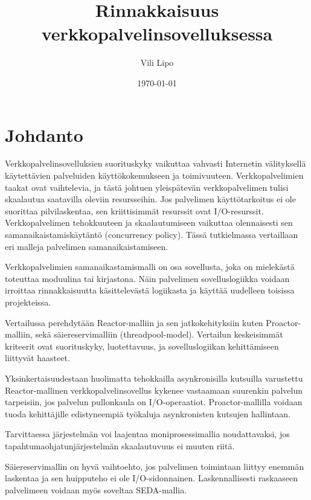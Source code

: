 \documentclass[finnish]{tktltiki2}
\title{Rinnakkaisuus verkkopalvelinsovelluksessa}
\author{Vili Lipo}
\date{\today}
\theoremstyle{definition}
\theoremstyle{remark}
\begin{document}
\frontmatter      %

\maketitle        %
\makeabstract     %

\tableofcontents  %


\mainmatter       %

\section{Johdanto}
Verkkopalvelinsovelluksien suorituskyky vaikuttaa vahvasti
Internetin välityksellä käytettävien palveluiden käyttökokemukseen ja toimivuuteen.
Verkkopalvelimien taakat ovat vaihtelevia, ja tästä johtuen
yleispätevän verkkopalvelimen tulisi skaalautua saatavilla oleviin resursseihin.
Jos palvelimen käyttötarkoitus ei ole suorittaa pilvilaskentaa, sen 
kriittisimmät resurssit ovat I/O-resurssit.
Verkkopalvelimen tehokkuuteen ja skaalautumiseen vaikuttaa olennaisesti
sen samanaikaistamiskäytäntö (concurrency policy). Tässä
tutkielmassa vertaillaan eri malleja palvelimen samanaikaistamiseen.

Verkkopalvelimien samanaikastamismalli on osa sovellusta,
joka on mielekästä toteuttaa moduulina tai kirjastona.
Näin palvelimen sovelluslogiikka voidaan irroittaa rinnakkaisuutta
käsittelevästä logiikasta ja käyttää uudelleen toisissa projekteissa.

Vertailussa perehdytään Reactor-malliin ja sen jatkokehityksiin kuten Proactor-malliin,
sekä säiereservimalliin (threadpool-model).
Vertailun keskeisimmät kriteerit ovat suorituskyky, luotettavuus, ja 
sovelluslogiikan kehittämiseen liittyvät haasteet.

Yksinkertaisuudestaan huolimatta tehokkailla asynkronisilla
kutsuilla varustettu Reactor-mallinen verkkopalvelinsovellus 
kykenee vastaamaan suurenkin palvelun tarpeisiin, jos palvelun 
pullonkaula on I/O-operaatiot.
Proactor-mallilla voidaan tuoda kehittäjille edistyneempiä työkaluja
asynkronisten kutsujen hallintaan.

Tarvittaessa järjestelmän voi laajentaa moniprosessimallia noudattavaksi,
jos tapahtumaohjatunjärjestelmän skaalautuvuus ei muuten riitä.

Säiereservimallin on hyvä vaihtoehto, jos palvelimen
toimintaan liittyy enemmän laskentaa ja sen huipputeho ei ole I/O-sidonnainen.
Laskennallisesti raskaaseen palvelimeen voidaan myös soveltaa SEDA-mallia.
\end{document}
